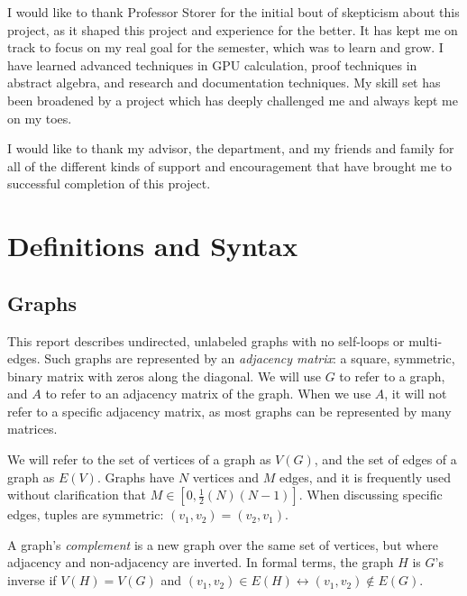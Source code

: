 \documentclass[11pt,a4paper]{report}
\begin{document}
I would like to thank Professor Storer for the initial bout of skepticism about this project, as it shaped this project and experience for the better.
It has kept me on track to focus on my real goal for the semester, which was to learn and grow.
I have learned advanced techniques in GPU calculation, proof techniques in abstract algebra, and research and documentation techniques.
My skill set has been broadened by a project which has deeply challenged me and always kept me on my toes.

I would like to thank my advisor, the department, and my friends and family for all of the different kinds of support and encouragement that have brought me to successful completion of this project.

\chapter{Definitions and Syntax}


\section{Graphs}
This report describes undirected, unlabeled graphs with no self-loops or multi-edges.
Such graphs are represented by an \emph{adjacency matrix}: a square, symmetric, binary matrix with zeros along the diagonal.
We will use $G$ to refer to a graph, and $A$ to refer to an adjacency matrix of the graph.
When we use $A$, it will not refer to a specific adjacency matrix, as most graphs can be represented by many matrices.

We will refer to the set of vertices of a graph as $V(G)$, and the set of edges of a graph as $E(V)$.
Graphs have $N$ vertices and $M$ edges, and it is frequently used without clarification that $M \in [0, \frac{1}{2}(N)(N-1)]$.
When discussing specific edges, tuples are symmetric: $(v_1, v_2) = (v_2, v_1)$.

A graph's \emph{complement} is a new graph over the same set of vertices, but where adjacency and non-adjacency are inverted.
In formal terms, the graph $H$ is $G$'s inverse if $V(H) = V(G)$ and $(v_1, v_2) \in E(H) \leftrightarrow (v_1, v_2) \notin E(G)$.
\end{document}
